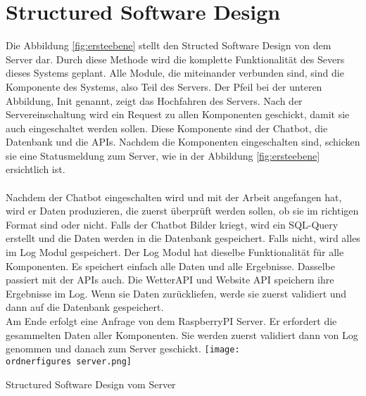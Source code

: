 \section{Structured Software Design}

Die Abbildung \ref{fig:ersteebene} stellt den Structed Software Design von dem Server dar. Durch diese Methode wird die komplette Funktionalität des Severs dieses Systems geplant. Alle Module, die miteinander verbunden sind, sind die Komponente des Systems, also Teil des Servers. 
Der Pfeil bei der unteren Abbildung, Init genannt, zeigt das Hochfahren des Servers. Nach der Servereinschaltung wird ein Request zu allen Komponenten geschickt, damit sie auch eingeschaltet werden sollen. Diese Komponente sind der Chatbot, die Datenbank und die APIs. 
Nachdem die Komponenten eingeschalten sind, schicken sie eine Statusmeldung zum Server, wie in der Abbildung \ref{fig:ersteebene} ersichtlich ist. \\
\\
Nachdem der Chatbot eingeschalten wird und mit der Arbeit angefangen hat, wird er Daten produzieren, die zuerst überprüft werden sollen, ob sie im richtigen Format sind oder nicht. Falls der Chatbot Bilder kriegt, wird ein SQL-Query erstellt und die Daten werden in die Datenbank gespeichert. Falls nicht, wird alles im Log Modul gespeichert. Der Log Modul hat dieselbe Funktionalität für alle Komponenten. Es speichert einfach alle Daten und alle Ergebnisse.
Dasselbe passiert mit der APIs auch. Die WetterAPI und Website API speichern ihre Ergebnisse im Log. Wenn sie Daten zurückliefen, werde sie zuerst validiert und dann auf die Datenbank gespeichert.\\

Am Ende erfolgt eine Anfrage von dem RaspberryPI Server. Er erfordert die gesammelten Daten aller Komponenten. Sie werden zuerst validiert dann von Log genommen und danach zum Server geschickt.
\captionsetup{type=figure}
\texttt{[image: \\ordnerfigures server.png]}
\caption{Structured Software Design vom Server}
\label{fig:ersteebene}
